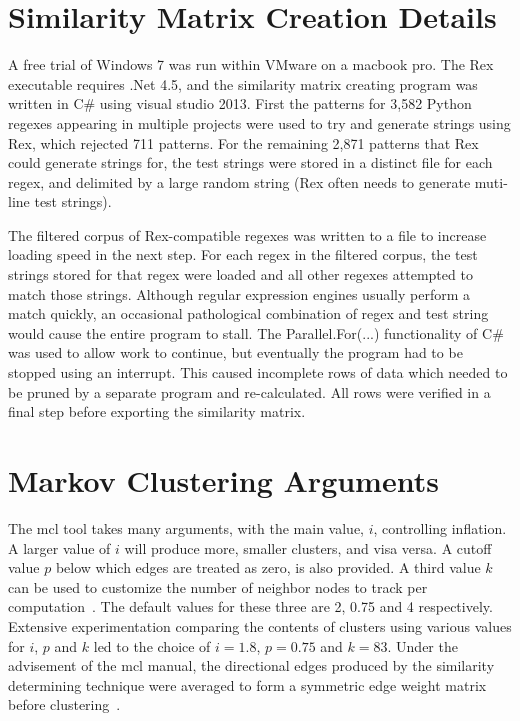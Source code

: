 \section*{Similarity Matrix Creation Details}
\label{app:similarityMatrixCreation}

A free trial of Windows 7 was run within VMware on a macbook pro.  The Rex~ executable requires .Net 4.5, and the similarity matrix creating program was written in C\# using visual studio 2013.  First the patterns for 3,582 Python regexes appearing in multiple projects were used to try and generate strings using Rex, which rejected 711 patterns.  For the remaining 2,871 patterns that Rex could generate strings for, the test strings were stored in a distinct file for each regex, and delimited by a large random string (Rex often needs to generate muti-line test strings).

The filtered corpus of Rex-compatible regexes was written to a file to increase loading speed in the next step.  For each regex in the filtered corpus, the test strings stored for that regex were loaded and all other regexes attempted to match those strings.  Although regular expression engines usually perform a match quickly, an occasional pathological combination of regex and test string would cause the entire program to stall.  The Parallel.For(...) functionality of C\# was used to allow work to continue, but eventually the program had to be stopped using an interrupt.  This caused incomplete rows of data which needed to be pruned by a separate program and re-calculated.  All rows were verified in a final step before exporting the similarity matrix.

\section*{Markov Clustering Arguments}
\label{app:mclTuning}

The mcl tool takes many arguments, with the main value, $i$, controlling inflation.  A larger value of $i$ will produce more, smaller clusters, and visa versa.  A cutoff value $p$ below which edges are treated as zero, is also provided.  A third value $k$ can be used to customize the number of neighbor nodes to track per computation~.  The default values for these three are 2, 0.75 and 4 respectively.  Extensive experimentation comparing the contents of clusters using various values for $i$, $p$ and $k$ led to the choice of $i=1.8$, $p=0.75$ and $k=83$.  Under the advisement of the mcl manual, the directional edges produced by the similarity determining technique were averaged to form a symmetric edge weight matrix before clustering~.
